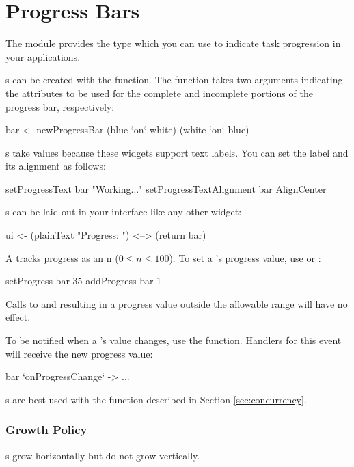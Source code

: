 \section{Progress Bars}
\label{sec:progress_bars}

The  module provides the  type which
you can use to indicate task progression in your applications.

s can be created with the 
function.  The function takes two  arguments indicating the
attributes to be used for the complete and incomplete portions of the
progress bar, respectively:

\begin{haskellcode}
 bar <- newProgressBar (blue `on` white) (white `on` blue)
\end{haskellcode}

s take  values because these widgets support
text labels.  You can set the label and its alignment as follows:

\begin{haskellcode}
 setProgressText bar "Working..."
 setProgressTextAlignment bar AlignCenter
\end{haskellcode}

s can be laid out in your interface like any other
widget:

\begin{haskellcode}
 ui <- (plainText "Progress: ") <--> (return bar)
\end{haskellcode}

A  tracks progress as an  n ($0 \le n \le
100$).  To set a 's progress value, use
 or :

\begin{haskellcode}
 setProgress bar 35
 addProgress bar 1
\end{haskellcode}

Calls to  and  resulting in a progress
value outside the allowable range will have no effect.

To be notified when a 's value changes, use the
 function.  Handlers for this event will receive
the new progress value:

\begin{haskellcode}
 bar `onProgressChange` \newVal -> ...
\end{haskellcode}

s are best used with the  function
described in Section \ref{sec:concurrency}.

\subsubsection{Growth Policy}

s grow horizontally but do not grow vertically.
